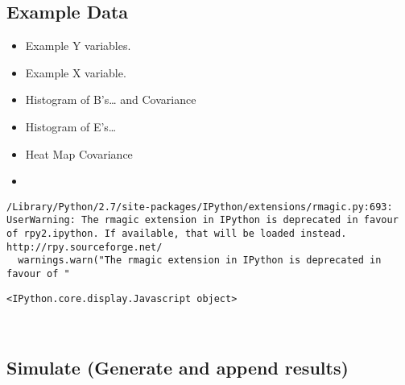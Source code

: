 \documentclass{article}
\begin{document}
    \subsection{Example Data}\label{example-data}

\begin{itemize}
\item
  Example Y variables.
\item
  Example X variable.
\item
  Histogram of B's\ldots{} and Covariance\\
\item
  Histogram of E's\ldots{}
\item
  Heat Map Covariance
\item
\end{itemize}


    \begin{Verbatim}[commandchars=\\\{\}]
/Library/Python/2.7/site-packages/IPython/extensions/rmagic.py:693: UserWarning: The rmagic extension in IPython is deprecated in favour of rpy2.ipython. If available, that will be loaded instead.
http://rpy.sourceforge.net/
  warnings.warn("The rmagic extension in IPython is deprecated in favour of "
    \end{Verbatim}


    
    \begin{verbatim}
<IPython.core.display.Javascript object>
    \end{verbatim}

    

    \begin{center}
    \end{center}
    { \hspace*{\fill} \\}
    
    \subsection{Simulate (Generate and append
results)}\label{simulate-generate-and-append-results}
\end{document}
